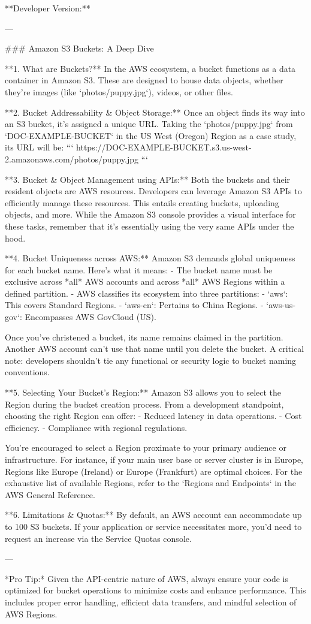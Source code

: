 **Developer Version:**

---

### Amazon S3 Buckets: A Deep Dive

**1. What are Buckets?**  
In the AWS ecosystem, a bucket functions as a data container in Amazon S3. These are designed to house data objects, whether they're images (like `photos/puppy.jpg`), videos, or other files.

**2. Bucket Addressability & Object Storage:**  
Once an object finds its way into an S3 bucket, it's assigned a unique URL. Taking the `photos/puppy.jpg` from `DOC-EXAMPLE-BUCKET` in the US West (Oregon) Region as a case study, its URL will be:  
```
https://DOC-EXAMPLE-BUCKET.s3.us-west-2.amazonaws.com/photos/puppy.jpg
```

**3. Bucket & Object Management using APIs:**  
Both the buckets and their resident objects are AWS resources. Developers can leverage Amazon S3 APIs to efficiently manage these resources. This entails creating buckets, uploading objects, and more. While the Amazon S3 console provides a visual interface for these tasks, remember that it's essentially using the very same APIs under the hood.

**4. Bucket Uniqueness across AWS:**  
Amazon S3 demands global uniqueness for each bucket name. Here's what it means:
- The bucket name must be exclusive across *all* AWS accounts and across *all* AWS Regions within a defined partition.
- AWS classifies its ecosystem into three partitions: 
  - `aws`: This covers Standard Regions.
  - `aws-cn`: Pertains to China Regions.
  - `aws-us-gov`: Encompasses AWS GovCloud (US).
  
Once you've christened a bucket, its name remains claimed in the partition. Another AWS account can't use that name until you delete the bucket. A critical note: developers shouldn't tie any functional or security logic to bucket naming conventions.

**5. Selecting Your Bucket’s Region:**  
Amazon S3 allows you to select the Region during the bucket creation process. From a development standpoint, choosing the right Region can offer:
- Reduced latency in data operations.
- Cost efficiency.
- Compliance with regional regulations.

You're encouraged to select a Region proximate to your primary audience or infrastructure. For instance, if your main user base or server cluster is in Europe, Regions like Europe (Ireland) or Europe (Frankfurt) are optimal choices. For the exhaustive list of available Regions, refer to the `Regions and Endpoints` in the AWS General Reference.

**6. Limitations & Quotas:**  
By default, an AWS account can accommodate up to 100 S3 buckets. If your application or service necessitates more, you'd need to request an increase via the Service Quotas console.

---

*Pro Tip:* Given the API-centric nature of AWS, always ensure your code is optimized for bucket operations to minimize costs and enhance performance. This includes proper error handling, efficient data transfers, and mindful selection of AWS Regions.